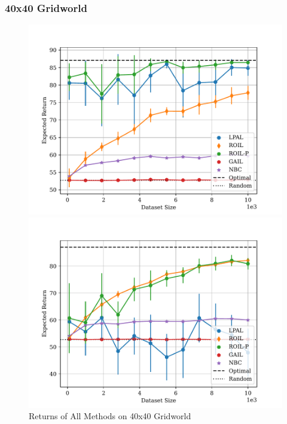 \documentclass{beamer}
\begin{document}
\begin{frame}
\frametitle{40x40 Gridworld}

\begin{figure}
  \begin{center}
  \begin{minipage}{0.45\linewidth}
    \centering
    \includegraphics[width=\linewidth]{../../pres_roil/plots/returns/40x40_gridworld_on_policy_returns.pdf}
  \end{minipage}
  \hspace{0.05\linewidth}
  \begin{minipage}{0.45\linewidth}
    \centering
    \includegraphics[width=\linewidth]{../../pres_roil/plots/returns/40x40_gridworld_off_policy_returns.pdf}
  \end{minipage}
  \end{center}
\caption{Returns of All Methods on 40x40 Gridworld}
\end{figure}
\end{frame}
\end{document}
